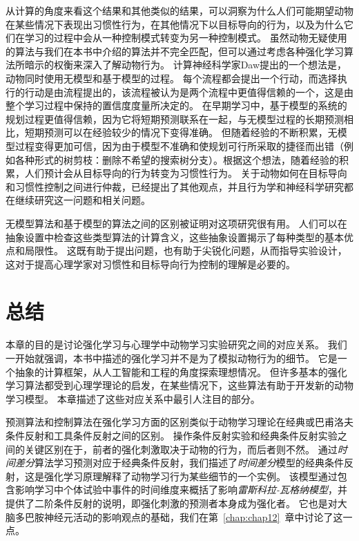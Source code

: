 从计算的角度来看这个结果和其他类似的结果，可以洞察为什么人们可能期望动物在某些情况下表现出习惯性行为，在其他情况下以目标导向的行为，以及为什么它们在学习的过程中会从一种控制模式转变为另一种控制模式。
虽然动物无疑使用的算法与我们在本书中介绍的算法并不完全匹配，但可以通过考虑各种强化学习算法所暗示的权衡来深入了解动物行为。
计算神经科学家Daw\cite{daw2005uncertainty}提出的一个想法是，动物同时使用无模型和基于模型的过程。
每个流程都会提出一个行动，而选择执行的行动是由流程提出的，该流程被认为是两个流程中更值得信赖的一个，这是由整个学习过程中保持的置信度度量所决定的。
在早期学习中，基于模型的系统的规划过程更值得信赖，因为它将短期预测联系在一起，与无模型过程的长期预测相比，短期预测可以在经验较少的情况下变得准确。
但随着经验的不断积累，无模型过程变得更加可信，因为由于模型不准确和使规划可行所采取的捷径而出错（例如各种形式的树剪枝：删除不希望的搜索树分支）。根据这个想法，随着经验的积累，人们预计会从目标导向的行为转变为习惯性行为。
关于动物如何在目标导向和习惯性控制之间进行仲裁，已经提出了其他观点，并且行为学和神经科学研究都在继续研究这一问题和相关问题。


无模型算法和基于模型的算法之间的区别被证明对这项研究很有用。
人们可以在抽象设置中检查这些类型算法的计算含义，这些抽象设置揭示了每种类型的基本优点和局限性。
这既有助于提出问题，也有助于尖锐化问题，从而指导实验设计，这对于提高心理学家对习惯性和目标导向行为控制的理解是必要的。


\section{总结}

本章的目的是讨论强化学习与心理学中动物学习实验研究之间的对应关系。
我们一开始就强调，本书中描述的强化学习并不是为了模拟动物行为的细节。
它是一个抽象的计算框架，从人工智能和工程的角度探索理想情况。
但许多基本的强化学习算法都受到心理学理论的启发，在某些情况下，这些算法有助于开发新的动物学习模型。
本章描述了这些对应关系中最引人注目的部分。


预测算法和控制算法在强化学习方面的区别类似于动物学习理论在经典或巴甫洛夫条件反射和工具条件反射之间的区别。
操作条件反射实验和经典条件反射实验之间的关键区别在于，前者的强化刺激取决于动物的行为，而后者则不然。
通过\textit{时间差分}算法学习预测对应于经典条件反射，我们描述了\textit{时间差分}模型的经典条件反射，这是强化学习原理解释了动物学习行为某些细节的一个实例。
该模型通过包含影响学习中个体试验中事件的时间维度来概括了影响\textit{雷斯科拉-瓦格纳模型}，并提供了二阶条件反射的说明，即强化刺激的预测者本身成为强化者。
它也是对大脑多巴胺神经元活动的影响观点的基础，我们在第~\ref{chap:chap12}~章中讨论了这一点。



